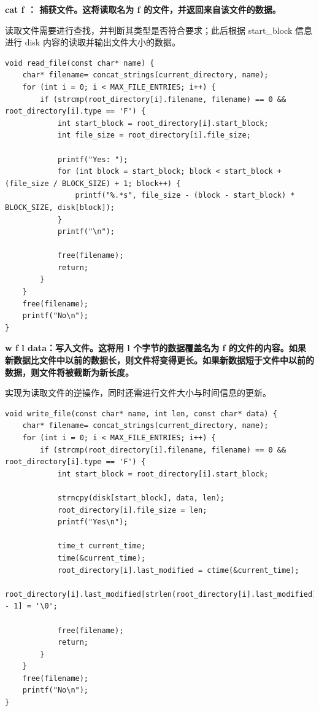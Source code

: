 \documentclass{article}
\begin{document}
\noindent\textbf{cat f ： 捕获文件。这将读取名为 f 的文件，并返回来自该文件的数据。}

读取文件需要进行查找，并判断其类型是否符合要求；此后根据 start\_block 信息进行 disk 内容的读取并输出文件大小的数据。

\begin{lstlisting}
void read_file(const char* name) {
    char* filename= concat_strings(current_directory, name);
    for (int i = 0; i < MAX_FILE_ENTRIES; i++) {
        if (strcmp(root_directory[i].filename, filename) == 0 && root_directory[i].type == 'F') {
            int start_block = root_directory[i].start_block;
            int file_size = root_directory[i].file_size;

            printf("Yes: ");
            for (int block = start_block; block < start_block + (file_size / BLOCK_SIZE) + 1; block++) {
                printf("%.*s", file_size - (block - start_block) * BLOCK_SIZE, disk[block]);
            }
            printf("\n");

            free(filename);
            return;
        }
    }
    free(filename);
    printf("No\n");
}
\end{lstlisting}

\noindent\textbf{w f l data：写入文件。这将用 l 个字节的数据覆盖名为 f 的文件的内容。如果新数据比文件中以前的数据长，则文件将变得更长。如果新数据短于文件中以前的数据，则文件将被截断为新长度。}

实现为读取文件的逆操作，同时还需进行文件大小与时间信息的更新。

\begin{lstlisting}
void write_file(const char* name, int len, const char* data) {
    char* filename= concat_strings(current_directory, name);
    for (int i = 0; i < MAX_FILE_ENTRIES; i++) {
        if (strcmp(root_directory[i].filename, filename) == 0 && root_directory[i].type == 'F') {
            int start_block = root_directory[i].start_block;

            strncpy(disk[start_block], data, len);
            root_directory[i].file_size = len;
            printf("Yes\n");

            time_t current_time;
            time(&current_time);
            root_directory[i].last_modified = ctime(&current_time);
            root_directory[i].last_modified[strlen(root_directory[i].last_modified) - 1] = '\0';

            free(filename);
            return;
        }
    }
    free(filename);
    printf("No\n");
}
\end{lstlisting}
\end{document}
